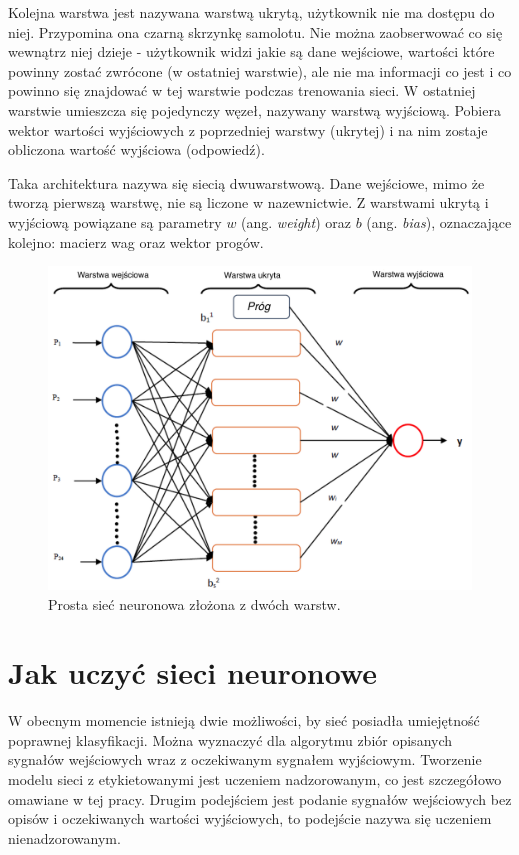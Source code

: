 \documentclass[12pt,a4paper,twoside,titlepage,openright]{book}
\begin{document}
Kolejna warstwa jest nazywana warstwą ukrytą, użytkownik nie ma dostępu do niej. Przypomina ona czarną skrzynkę samolotu. Nie można zaobserwować co się wewnątrz niej dzieje - użytkownik widzi jakie są dane wejściowe, wartości które powinny zostać zwrócone (w ostatniej warstwie), ale nie ma informacji co jest i co powinno się znajdować w tej warstwie podczas trenowania sieci.
W ostatniej warstwie umieszcza się pojedynczy węzeł, nazywany warstwą wyjściową. Pobiera wektor wartości wyjściowych z poprzedniej warstwy (ukrytej) i na nim zostaje obliczona wartość wyjściowa (odpowiedź).

Taka architektura nazywa się siecią dwuwarstwową. Dane wejściowe, mimo że tworzą pierwszą warstwę, nie są liczone w nazewnictwie.
Z warstwami ukrytą i wyjściową powiązane są parametry \(w\) (ang. \textit{weight}) oraz \(b\) (ang. \textit{bias}), oznaczające kolejno: macierz wag oraz wektor progów.

\begin{figure}[ht]
	\centering
			\includegraphics[resolution=100, scale=0.2]{SiecNeuronowa.png}
		\caption{Prosta sieć neuronowa złożona z dwóch warstw.}
\end{figure}

\section{Jak uczyć sieci neuronowe}
W obecnym momencie istnieją dwie możliwości, by sieć posiadła umiejętność poprawnej klasyfikacji. Można wyznaczyć dla algorytmu zbiór opisanych sygnałów wejściowych wraz z oczekiwanym sygnałem wyjściowym. Tworzenie modelu sieci z etykietowanymi jest uczeniem nadzorowanym, co jest szczegółowo omawiane w tej pracy. Drugim podejściem jest podanie sygnałów wejściowych bez opisów i oczekiwanych wartości wyjściowych, to podejście nazywa się uczeniem nienadzorowanym.
\end{document}
